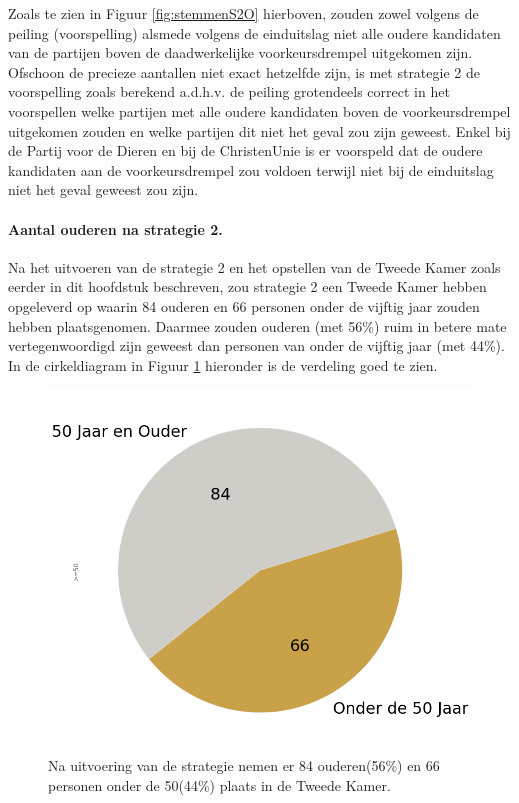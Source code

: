 Zoals te zien in Figuur \ref{fig:stemmenS2O} hierboven, zouden zowel volgens de peiling (voorspelling) alsmede volgens de einduitslag niet alle oudere kandidaten van de partijen boven de daadwerkelijke voorkeursdrempel uitgekomen zijn. Ofschoon de precieze aantallen niet exact hetzelfde zijn, is met strategie 2 de voorspelling zoals berekend a.d.h.v. de peiling grotendeels correct in het voorspellen welke partijen met alle oudere kandidaten boven de voorkeursdrempel uitgekomen zouden en welke partijen dit niet het geval zou zijn geweest. Enkel bij de Partij voor de Dieren en bij de ChristenUnie is er voorspeld dat de oudere kandidaten aan de voorkeursdrempel zou voldoen terwijl niet bij de einduitslag niet het geval geweest zou zijn.

\paragraph{Aantal ouderen na strategie 2.}
Na het uitvoeren van de strategie 2 en het opstellen van de Tweede Kamer zoals eerder in dit hoofdstuk beschreven, zou strategie 2 een Tweede Kamer hebben opgeleverd op waarin 84 ouderen en 66 personen onder de vijftig jaar zouden hebben plaatsgenomen. Daarmee zouden ouderen (met 56\%) ruim in betere mate vertegenwoordigd zijn geweest dan personen van onder de vijftig jaar (met 44\%). In de cirkeldiagram in Figuur \ref{fig:pcS2O} hieronder is de verdeling goed te zien. 


\begin{figure}[H]
\centering
	\includegraphics[width=0.42\linewidth]{pie_chart_willekeurig_ouderen.png}

			\caption{Na uitvoering van de strategie nemen er 84 ouderen(56\%) en 66 personen onder de 50(44\%) plaats in de Tweede Kamer.}

\label{fig:pcS2O}
\end{figure}





